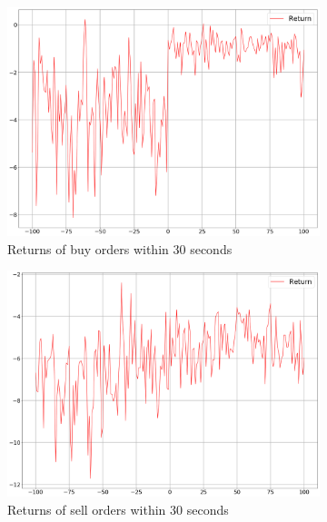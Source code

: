 \begin{figure}
\begin{subfigure}[b]{0.45\textwidth}
        \includegraphics[width=\textwidth]{images/behaviour-up-30s-buy.png}
        \caption{Returns of buy orders within 30 seconds}
        \label{fig:behvaiour-up-30s-buy}
    \end{subfigure}
    \begin{subfigure}[b]{0.45\textwidth}
        \includegraphics[width=\textwidth]{images/behaviour-up-30s-sell.png}
        \caption{Returns of sell orders within 30 seconds}
        \label{fig:behvaiour-up-30s-sell}
    \end{subfigure}
    \begin{subfigure}[b]{0.45\textwidth}

\end{subfigure}
\end{figure}
